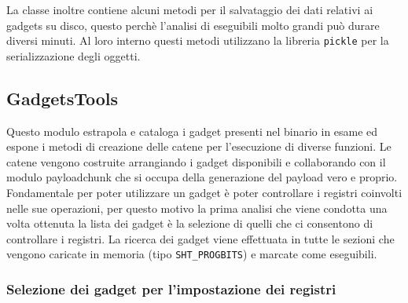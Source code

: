 La classe inoltre contiene alcuni metodi per il salvataggio dei dati
relativi ai gadgets su disco, questo perchè l'analisi di eseguibili
molto grandi può durare diversi minuti. Al loro interno questi metodi
utilizzano la libreria \lstinline{pickle} per la serializzazione degli
oggetti.

\subsection{GadgetsTools}

Questo modulo estrapola e cataloga i gadget presenti nel binario in
esame ed espone i metodi di creazione delle catene per l'esecuzione di
diverse funzioni. Le catene vengono costruite arrangiando i gadget
disponibili e collaborando con il modulo payloadchunk che si occupa
della generazione del payload vero e proprio. Fondamentale per poter
utilizzare un gadget è poter controllare i registri coinvolti nelle
sue operazioni, per questo motivo la prima analisi che viene condotta
una volta ottenuta la lista dei gadget è la selezione di quelli che ci
consentono di controllare i registri. La ricerca dei gadget viene
effettuata in tutte le sezioni che vengono caricate in memoria (tipo
\lstinline{SHT_PROGBITS}) e marcate come eseguibili.

\subsubsection{Selezione dei gadget per l'impostazione dei registri}

